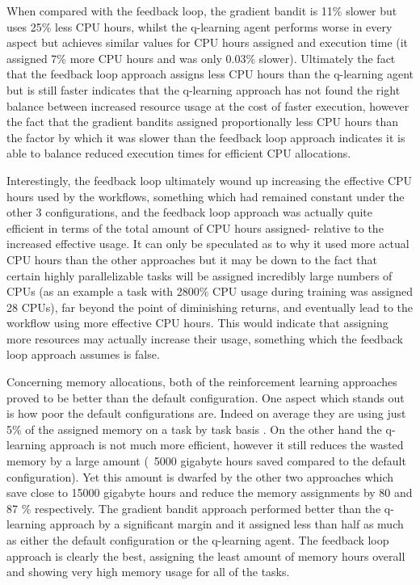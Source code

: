When compared with the feedback loop, the gradient bandit is 11\% slower but uses 25\% less CPU hours, whilst the q-learning agent performs worse in every aspect but achieves similar values for CPU hours assigned and execution time (it assigned 7\% more CPU hours and was only 0.03\% slower). Ultimately the fact that the feedback loop approach assigns less CPU hours than the q-learning agent but is still faster indicates that the q-learning approach has not found the right balance between increased resource usage at the cost of faster execution, however the fact that the gradient bandits assigned proportionally less CPU hours than the factor by which it was slower than the feedback loop approach indicates it is able to balance reduced execution times for efficient CPU allocations.

Interestingly, the feedback loop ultimately wound up increasing the effective CPU hours used by the workflows, something which had remained constant under the other 3 configurations, and the feedback loop approach was actually quite efficient in terms of the total amount of CPU hours assigned- relative to the increased effective usage. It can only be speculated as to why it used more actual CPU hours than the other approaches but it may be down to the fact that certain highly parallelizable tasks will be assigned incredibly large numbers of CPUs (as an example a task with 2800\% CPU usage during training was assigned 28 CPUs), far beyond the point of diminishing returns, and eventually lead to the workflow using more effective CPU hours. This would indicate that assigning more resources may actually increase their usage, something which the feedback loop approach assumes is false.

Concerning memory allocations, both of the reinforcement learning approaches proved to be better than the default configuration. One aspect which stands out is how poor the default configurations are. Indeed on average they are using just 5\% of the assigned memory on a task by task basis . On the other hand the q-learning approach is not much more efficient, however it still reduces the wasted memory by a large amount (~5000 gigabyte hours saved compared to the default configuration). Yet this amount is dwarfed by the other two approaches which save close to 15000 gigabyte hours and reduce the memory assignments by 80 and 87 \% respectively. The gradient bandit approach performed better than the q-learning approach by a significant margin and it assigned less than half as much as either the default configuration or the q-learning agent. The feedback loop approach is clearly the best, assigning the least amount of memory hours overall and showing very high memory usage for all of the tasks.

